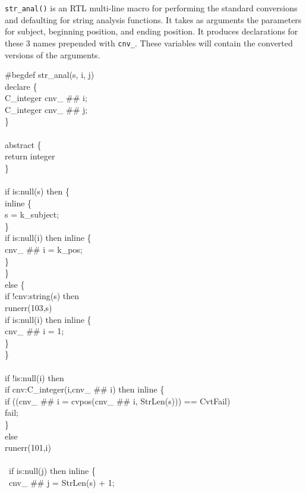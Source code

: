\texttt{str\_anal()} is an RTL multi-line macro for performing the
standard conversions and defaulting for string analysis functions. It
takes as arguments the parameters for subject, beginning position, and
ending position. It produces declarations for these 3 names prepended
with \texttt{cnv\_}. These variables will contain the converted
versions of the arguments.

\begin{iconcode}
\#begdef str\_anal(s, i, j)\\
\>declare \{\\
\>\>C\_integer cnv\_ \#\# i;\\
\>\>C\_integer cnv\_ \#\# j;\\
\>\>\}\\
\\
\>abstract \{\\
\>\>return integer\\
\>\>\}\\
\\
\>if is:null(s) then \{\\
\>\>inline \{\\
\>\>\>s = k\_subject;\\
\>\>\>\}\\
\>\>if is:null(i) then inline \{\\
\>\>\>cnv\_ \#\# i = k\_pos;\\
\>\>\>\}\\
\>\>\}\\
\>else \{\\
\>\>if !cnv:string(s) then\\
\>\>\>runerr(103,s)\\
\>\>if is:null(i) then inline \{\\
\>\>\>cnv\_ \#\# i = 1;\\
\>\>\>\}\\
\>\>\}\\
\\
\>if !is:null(i) then\\
\>\>if cnv:C\_integer(i,cnv\_ \#\# i) then inline \{\\
\>\>\>if ((cnv\_ \#\# i = cvpos(cnv\_ \#\# i, StrLen(s))) == CvtFail)\\
\>\>\>\>fail;\\
\>\>\>\}\\
\>\>else\\
\>\>\>runerr(101,i)\\
\\
\>\ if is:null(j) then inline \{\\
\>\>\ cnv\_ \#\# j = StrLen(s) + 1;\\

\end{iconcode}

